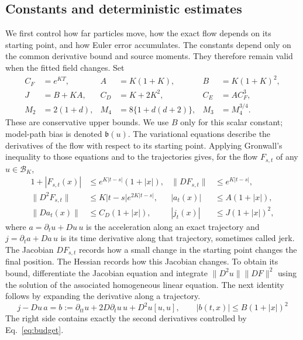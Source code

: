\subsection{Constants and deterministic estimates}
We first control how far particles move, how the exact flow depends on its
starting point, and how Euler error accumulates. The constants depend only
on the common derivative bound and source moments. They therefore remain
valid when the fitted field changes.
Set
\begin{align}
 C_F&=e^{KT}, & A&=K(1+K), & B&=K(1+K)^2,\\
 J&=B+KA, & C_D&=K+2K^2, & C_E&=AC_F^3,\\
 M_2&=2(1+d), & M_4&=8\{1+d(d+2)\}, & M_3&=M_4^{3/4}.
 \label{eq:base-constants}
\end{align}
These are conservative upper bounds. We use $B$ only for this scalar constant;
model-path bias is denoted $\mathfrak b(u)$.
The variational equations describe the derivatives of the flow with respect
to its starting point. Applying Gronwall's inequality to those equations and
to the trajectories gives, for the flow $F_{s,t}$ of any $u\in\mathcal B_K$,
\begin{align}
 1+|F_{s,t}(x)|&\le e^{K|t-s|}(1+|x|), &
 \|DF_{s,t}\|&\le e^{K|t-s|},\\
 \|D^2F_{s,t}\|&\le K|t-s|e^{2K|t-s|}, &
 |a_t(x)|&\le A(1+|x|),\\
 \|Da_t(x)\|&\le C_D(1+|x|), &
 |j_t(x)|&\le J(1+|x|)^2,
 \label{eq:flow-bounds}
\end{align}
where $a=\partial_tu+Du\,u$ is the acceleration along an exact trajectory
and $j=\partial_ta+Da\,u$ is its time derivative along that trajectory,
sometimes called jerk.
The Jacobian $DF_{s,t}$ records how a small change in the starting point
changes the final position. The Hessian records how this Jacobian changes.
To obtain its bound, differentiate the Jacobian equation and integrate
$\|D^2u\|\|DF\|^2$ using the solution of the associated homogeneous linear
equation. The next identity follows by expanding the derivative along a
trajectory.
\begin{equation}
 j-Du\,a=b:=\partial_{tt}u+2D\partial_tu\,u+D^2u[u,u],
 \qquad |b(t,x)|\le B(1+|x|)^2
 \label{eq:transport-jerk}
\end{equation}
The right side contains exactly the second derivatives controlled by
Eq.~\eqref{eq:budget}.

